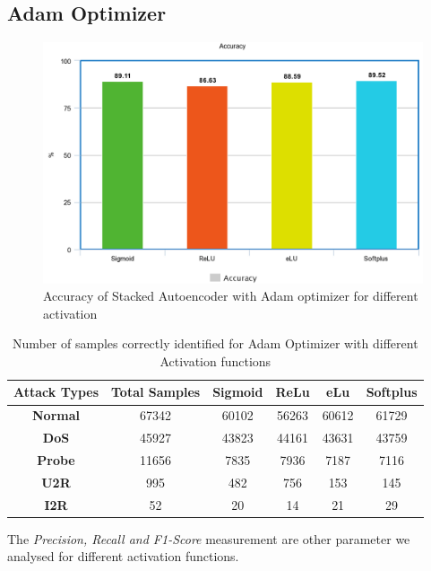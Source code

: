 \documentclass[12pt, a4paper]{report}
\begin{document}
\begin{appendices}
 \section{Adam Optimizer}
 \begin{figure}[h]
\centering
\captionsetup{justification=centering,margin=2cm}
\includegraphics[width=13cm]{accuracy_adam_tflearn.png}
\caption{ Accuracy of Stacked Autoencoder with Adam optimizer for different activation }
\label{fig:acc_adam}
\end{figure}


\begin{table}[h]
\centering
\captionsetup{justification=centering,margin=2cm}
\begin{tabular}{|c|c|c|c|c|c|}
\hline
\textbf{Attack Types} & \textbf{Total Samples} & \textbf{Sigmoid} & \textbf{ReLu} & \textbf{eLu} & \textbf{Softplus} \\ \hline
\textbf{Normal}       & 67342                  & 60102            & 56263         & 60612        & 61729             \\ \hline
\textbf{DoS}          & 45927                  & 43823            & 44161         & 43631        & 43759             \\ \hline
\textbf{Probe}        & 11656                  & 7835             & 7936          & 7187         & 7116              \\ \hline
\textbf{U2R}          & 995                    & 482              & 756           & 153          & 145               \\ \hline
\textbf{I2R}          & 52                     & 20               & 14            & 21           & 29                \\ \hline
\end{tabular}
\caption{Number of samples correctly identified for Adam Optimizer with different Activation functions}
\label{confusion_adam_tflearn}
\end{table}
\clearpage
  The \textit{Precision, Recall and F1-Score} measurement are other parameter we analysed for different activation functions. \\ \par

\end{appendices}
\end{document}
